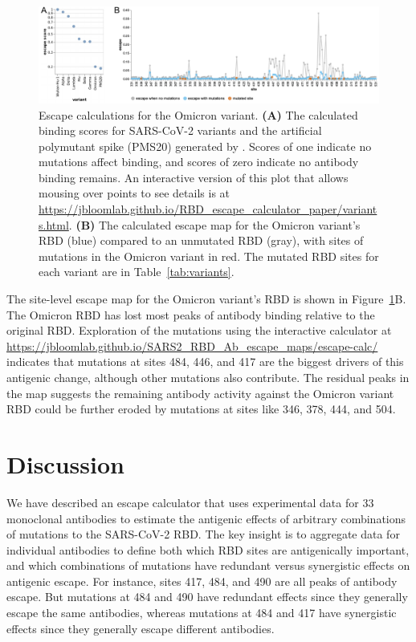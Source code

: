 \documentclass[9pt,twocolumn,twoside]{gsajnl_modified}
\begin{document}
\begin{figure}
\includegraphics[width=\linewidth]{figures/Omicron/Omicron.pdf}
\caption{Escape calculations for the Omicron variant.
{\bf (A)} The calculated binding scores for SARS-CoV-2 variants and the artificial polymutant spike (PMS20) generated by \citet{schmidt2021high}.
Scores of one indicate no mutations affect binding, and scores of zero indicate no antibody binding remains.
An interactive version of this plot that allows mousing over points to see details is at \url{https://jbloomlab.github.io/RBD_escape_calculator_paper/variants.html}.
{\bf (B)} The calculated escape map for the Omicron variant's RBD (blue) compared to an unmutated RBD (gray), with sites of mutations in the Omicron variant in red.
The mutated RBD sites for each variant are in Table~\ref{tab:variants}.
}
\label{fig:Omicron}
\end{figure}

The site-level escape map for the Omicron variant's RBD is shown in Figure~\ref{fig:Omicron}B.
The Omicron RBD has lost most peaks of antibody binding relative to the original RBD.
Exploration of the mutations using the interactive calculator at \url{https://jbloomlab.github.io/SARS2_RBD_Ab_escape_maps/escape-calc/} indicates that mutations at sites 484, 446, and 417 are the biggest drivers of this antigenic change, although other mutations also contribute.
The residual peaks in the map suggests the remaining antibody activity against the Omicron variant RBD could be further eroded by mutations at sites like 346, 378, 444, and 504.

\section{Discussion}
We have described an escape calculator that uses experimental data for 33 monoclonal antibodies to estimate the antigenic effects of arbitrary combinations of mutations to the SARS-CoV-2 RBD.
The key insight is to aggregate data for individual antibodies to define both which RBD sites are antigenically important, and which combinations of mutations have redundant versus synergistic effects on antigenic escape.
For instance, sites 417, 484, and 490 are all peaks of antibody escape.
But mutations at 484 and 490 have redundant effects since they generally escape the same antibodies, whereas mutations at 484 and 417 have synergistic effects since they generally escape different antibodies.
\end{document}
